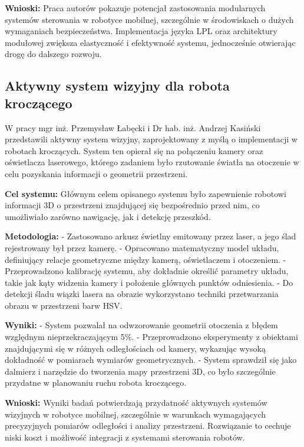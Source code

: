\documentclass[a4paper,twoside,12pt]{book}
\begin{document}
\textbf{Wnioski:}
Praca autorów pokazuje potencjał zastosowania modularnych systemów sterowania w robotyce mobilnej, szczególnie w środowiskach o dużych wymaganiach bezpieczeństwa. Implementacja języka LPL oraz architektury modułowej zwiększa elastyczność i efektywność systemu, jednocześnie otwierając drogę do dalszego rozwoju.

\subsection{Aktywny system wizyjny dla robota kroczącego}

W pracy \cite{bib:labkecki2009aktywny} mgr inż. Przemysław Łabęcki i Dr hab. inż. Andrzej Kasiński przedstawili aktywny system wizyjny, zaprojektowany z myślą o implementacji w robotach kroczących. System ten opierał się na połączeniu kamery oraz oświetlacza laserowego, którego zadaniem było rzutowanie światła na otoczenie w celu pozyskania informacji o geometrii przestrzeni.

\textbf{Cel systemu:}
Głównym celem opisanego systemu było zapewnienie robotowi informacji 3D o przestrzeni znajdującej się bezpośrednio przed nim, co umożliwiało zarówno nawigację, jak i detekcję przeszkód.

\textbf{Metodologia:}
- Zastosowano arkusz świetlny emitowany przez laser, a jego ślad rejestrowany był przez kamerę.
- Opracowano matematyczny model układu, definiujący relacje geometryczne między kamerą, oświetlaczem i otoczeniem.
- Przeprowadzono kalibrację systemu, aby dokładnie określić parametry układu, takie jak kąty widzenia kamery i położenie głównych punktów odniesienia.
- Do detekcji śladu wiązki lasera na obrazie wykorzystano techniki przetwarzania obrazu w przestrzeni barw HSV.

\textbf{Wyniki:}
- System pozwalał na odwzorowanie geometrii otoczenia z błędem względnym nieprzekraczającym 5\%.
- Przeprowadzono eksperymenty z obiektami znajdującymi się w różnych odległościach od kamery, wykazując wysoką dokładność w pomiarach wymiarów geometrycznych.
- System sprawdził się jako dalmierz i narzędzie do tworzenia mapy przestrzeni 3D, co było szczególnie przydatne w planowaniu ruchu robota kroczącego.

\textbf{Wnioski:}
Wyniki badań potwierdzają przydatność aktywnych systemów wizyjnych w robotyce mobilnej, szczególnie w warunkach wymagających precyzyjnych pomiarów odległości i analizy przestrzeni. Rozwiązanie to cechuje niski koszt i możliwość integracji z systemami sterowania robotów.
\end{document}
